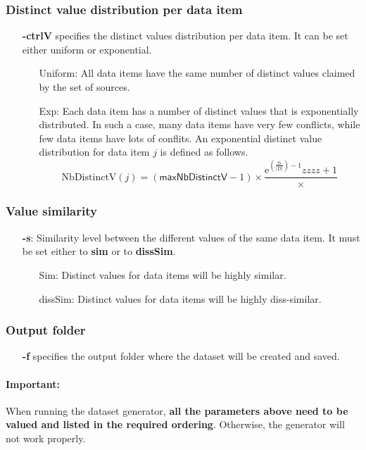 \documentclass[a4paper,10pt]{scrartcl}
\newcommand{\expo}[1]{\ensuremath{\mathrm{e}^{#1}}}
\newcommand{\nbDistinctValue}[1]{\ensuremath{\mathrm{NbDistinctV}(#1)}}
\newcommand{\maxNbDistinctV}{\ensuremath{\mathsf{maxNbDistinctV}}}
\begin{document}
\subsubsection{Distinct value distribution per data item}
\begin{itemize}
 \item[\textbf{-ctrlV}] specifies the distinct values distribution per data item. It can be set either uniform  or exponential.
 \begin{itemize}
  \item [Uniform:] All data items have the same number of distinct values claimed by the set of sources.
  \item [Exp:]  Each data item has a number of distinct values that is exponentially distributed. In such a case, many data 
  items have very few conflicts, while few data items have lots of conflits. An exponential distinct value distribution for 
  data item $j$ is defined as follows.
  \[
   \nbDistinctValue{j} = (\maxNbDistinctV - 1)\times \frac{\expo{(\frac{2i}{|D|})-1}{zzzz} + 1}{×}
  \]

 \end{itemize}
\end{itemize}
\subsubsection{Value similarity}
\begin{itemize}
  \item[\textbf{-s}:] Similarity level between the different values of the same data item. It must be set either to \textbf{sim} or 
 to \textbf{dissSim}.
  \begin{itemize}
   \item [Sim:] Distinct values for data items will be highly similar.
   \item [dissSim:] Distinct values for data items will be highly diss-similar.
  \end{itemize}
\end{itemize}
\subsubsection{Output folder}
\begin{itemize}
 \item[\textbf{-f}] specifies the output folder where the dataset will be created and saved.
\end{itemize}

\paragraph{Important:}When running the dataset generator, \textbf{all the parameters above need to be valued and listed in the required ordering}.
Otherwise, the generator will not work properly.
\end{document}
